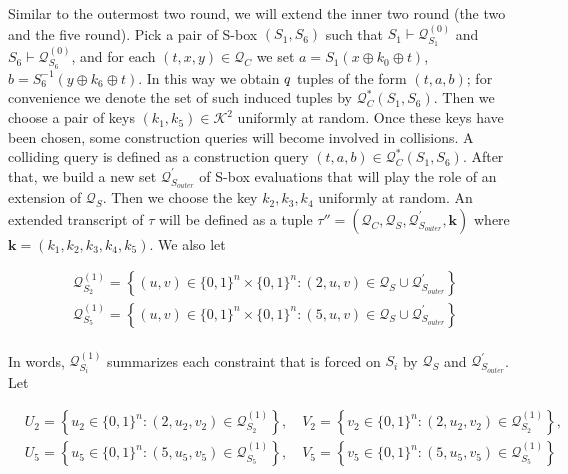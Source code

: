 Similar to the outermost two round, we will extend the inner two round (the two and the five round).  Pick a pair of S-box $(S_1, S_6)$ such that $S_{1} \vdash \mathcal{Q}_{S_{1}}^{(0)}$ and $S_{6} \vdash \mathcal{Q}_{S_{6}}^{(0)}$, and for each $ (t, x, y) \in \mathcal{Q}_{C}$ we set $a=S_{1}\left(x \oplus k_{0} \oplus t\right)$, $b=S_{6}^{-1}\left(y \oplus k_{6} \oplus t\right)$. In this way we obtain $\mathnormal{q}$ tuples of the form $(t, a, b)$; for convenience we denote the set of such induced tuples by $\mathcal{Q}_{C}^{*}\left(S_{1}, S_{6}\right)$. Then we choose a pair of keys $\left(k_{1}, k_{5}\right) \in \mathcal{K}^{2}$ uniformly at random. Once these keys have been chosen, some construction queries will become involved in collisions. A colliding query is defined as a construction query $(t, a, b) \in \mathcal{Q}_{C}^{*}\left(S_{1}, S_{6}\right)$. After that, we build a new set $\mathcal{Q}_{S_{outer}}^{\prime}$ of S-box evaluations that will play the role of an extension of $\mathcal{Q}_{S}$. Then we choose the key $k_2, k_3, k_4$ uniformly at random. An extended transcript of $\tau$ will be defined as a tuple $\tau''=\left(\mathcal{Q}_{C}, \mathcal{Q}_{S}, \mathcal{Q}_{S_{outer}}^{\prime}, \mathbf{k}\right)$ where $\mathbf{k}=\left(k_{1}, k_{2},k_{3},k_{4}, k_{5}\right)$. We also let

$$
\begin{aligned}
&\mathcal{Q}_{S_{2}}^{(1)}=\left\{(u, v) \in\{0,1\}^{n} \times\{0,1\}^{n}:(2, u, v) \in \mathcal{Q}_{S} \cup \mathcal{Q}_{S_{outer}}^{\prime}\right\}\\
&\mathcal{Q}_{S_{5}}^{(1)}=\left\{(u, v) \in\{0,1\}^{n} \times\{0,1\}^{n}:(5, u, v) \in \mathcal{Q}_{S} \cup \mathcal{Q}_{S_{outer}}^{\prime}\right\}\\
\end{aligned}
$$

\noindent In words, $\mathcal{Q}_{S_{i}}^{(1)}$ summarizes each constraint that is forced on $S_{i}$ by $\mathcal{Q}_{S}$ and $\mathcal{Q}_{S_{outer}}^{\prime}$. Let

$$
\begin{aligned}
&U_{2}=\left\{u_{2} \in\{0,1\}^{n}:\left(2, u_{2}, v_{2}\right) \in \mathcal{Q}_{S_{2}}^{(1)}\right\}, \quad V_{2}=\left\{v_{2} \in\{0,1\}^{n}:\left(2, u_{2}, v_{2}\right) \in \mathcal{Q}_{S_{2}}^{(1)}\right\},\\
&U_{5}=\left\{u_{5} \in\{0,1\}^{n}:\left(5, u_{5}, v_{5}\right) \in \mathcal{Q}_{S_{5}}^{(1)}\right\}, \quad V_{5}=\left\{v_{5} \in\{0,1\}^{n}:\left(5, u_{5}, v_{5}\right) \in \mathcal{Q}_{S_{5}}^{(1)}\right\}\\
\end{aligned}
$$


